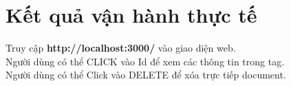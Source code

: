 \headerandfooterconfig

\chapter{Kết quả vận hành thực tế}

Truy cập \textbf{http://localhost:3000/} vào giao diện web.\\
\label{ref{fig5_1}}
Người dùng có thể CLICK vào Id để xem các thông tin trong tag.\\
Người dùng có thể Click vào DELETE để xóa trực tiếp document.\\
\label{ref{fig5_2}}
